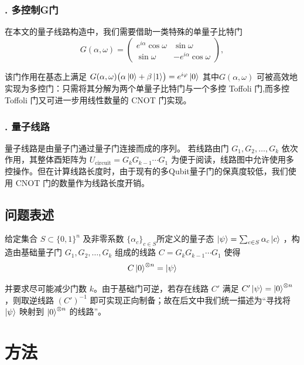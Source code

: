 \documentclass[10.5pt,compsoc,UTF8]{CjC}
\theoremstyle{mystyle}
\begin{document}
\subsubsection*{. 多控制G门}


在本文的量子线路构造中，我们需要借助一类特殊的单量子比特门
\begin{equation}
  G(\alpha,\omega)=
  \begin{pmatrix}
    e^{i\alpha}\cos\omega & \sin\omega\\[4pt]
    \sin\omega & -e^{i\alpha}\cos\omega
  \end{pmatrix},
\end{equation}\par
该门作用在基态上满足
$
  G(\alpha,\omega)\bigl(\alpha\ket{0}+\beta\ket{1}\bigr)=e^{i\varphi}\ket{0}
$
其中$G(\alpha,\omega)$ 可被高效地实现为多控门：只需将其分解为两个单量子比特门与一个多控 Toffoli 门,而多控 Toffoli 门又可进一步用线性数量的 CNOT 门实现\cite{barenco1995elementary}。

\subsubsection*{. 量子线路}
量子线路是由量子门通过量子门连接而成的序列。  
若线路由门 $G_1,G_2,\ldots,G_k$ 依次作用，其整体酉矩阵为
$
U_{\text{circuit}} = G_k G_{k-1}\cdots G_1
$
为便于阅读，线路图中允许使用多控操作。但在计算线路长度时，由于现有的多Qubit量子门的保真度较低，我们使用 CNOT 门的数量作为线路长度开销。

\subsection{\heiti 问题表述}
 
给定集合 $S\subset\{0,1\}^n$ 及非零系数 $\{\alpha_c\}_{c\in S}$所定义的量子态
$
\ket{\psi}=\sum_{c\in S}\alpha_c\ket{c}
$
，构造由基础量子门 $G_1,G_2,\dots,G_k$ 组成的线路
$
C=G_k G_{k-1}\cdots G_1
$
使得
\begin{equation}
C\ket{0}^{\otimes n}=\ket{\psi}
\end{equation}\par
并要求尽可能减少门数 $k$。由于基础门可逆，若存在线路 $C'$ 满足 $C'\ket{\psi}=\ket{0}^{\otimes n}$，则取逆线路 $(C')^{-1}$ 即可实现正向制备；故在后文中我们统一描述为“寻找将 $\ket{\psi}$ 映射到 $\ket{0}^{\otimes n}$ 的线路”。



\section{\heiti 方法}
\end{document}
